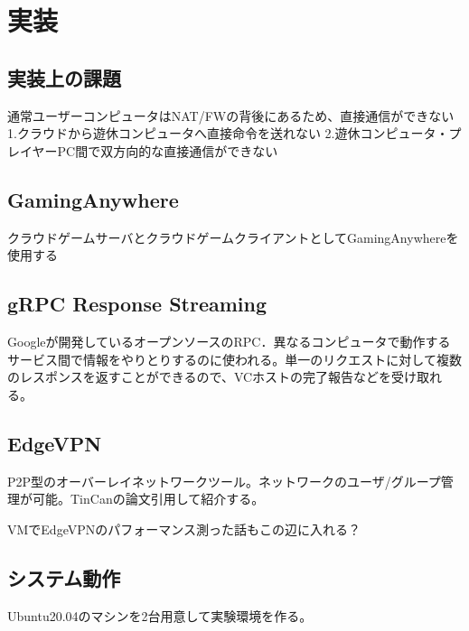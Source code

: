 \section{実装}

\subsection{実装上の課題}
通常ユーザーコンピュータはNAT/FWの背後にあるため、直接通信ができない
1.クラウドから遊休コンピュータへ直接命令を送れない
2.遊休コンピュータ・プレイヤーPC間で双方向的な直接通信ができない

\subsection{GamingAnywhere}
クラウドゲームサーバとクラウドゲームクライアントとしてGamingAnywhereを使用する

\subsection{gRPC Response Streaming}
Googleが開発しているオープンソースのRPC．異なるコンピュータで動作するサービス間で情報をやりとりするのに使われる。単一のリクエストに対して複数のレスポンスを返すことができるので、VCホストの完了報告などを受け取れる。

\subsection{EdgeVPN}
P2P型のオーバーレイネットワークツール。ネットワークのユーザ/グループ管理が可能。TinCanの論文引用して紹介する。

VMでEdgeVPNのパフォーマンス測った話もこの辺に入れる？

\subsection{システム動作}
Ubuntu20.04のマシンを2台用意して実験環境を作る。
